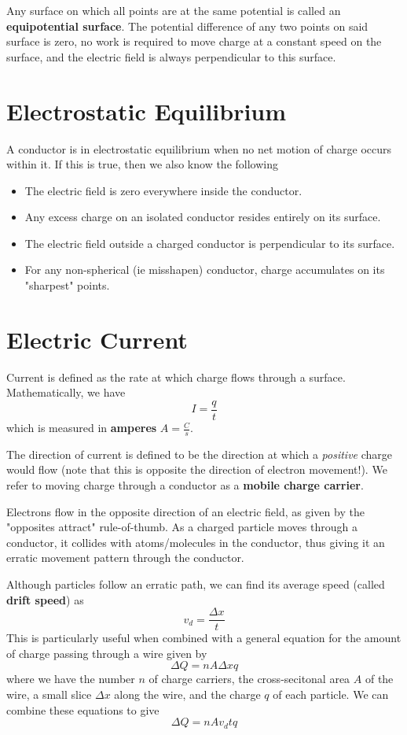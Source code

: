 \documentclass[12pt]{article}
\begin{document}
Any surface on which all points are at the same potential is called an {\bf equipotential surface}. The potential difference of any two points on said surface is zero, no work is required to move charge at a constant speed on the surface, and the electric field is always perpendicular to this surface.

\section*{Electrostatic Equilibrium}
A conductor is in electrostatic equilibrium when no net motion of charge occurs within it. If this is true, then we also know the following
\begin{itemize}
\item The electric field is zero everywhere inside the conductor.
\item Any excess charge on an isolated conductor resides entirely on its surface.
\item The electric field outside a charged conductor is perpendicular to its surface.
\item For any non-spherical (ie misshapen) conductor, charge accumulates on its "sharpest" points.
\end{itemize}

\section*{Electric Current}
Current is defined as the rate at which charge flows through a surface. Mathematically, we have \[ I = \frac{q}{t} \] which is measured in {\bf amperes} $A = \frac{C}{s}$.

The direction of current is defined to be the direction at which a \emph{positive} charge would flow (note that this is opposite the direction of electron movement!). We refer to moving charge through a conductor as a {\bf mobile charge carrier}.

Electrons flow in the opposite direction of an electric field, as given by the "opposites attract" rule-of-thumb. As a charged particle moves through a conductor, it collides with atoms/molecules in the conductor, thus giving it an erratic movement pattern through the conductor.

Although particles follow an erratic path, we can find its average speed (called {\bf drift speed}) as \[ v_d = \frac{\Delta x}{t} \] This is particularly useful when combined with a general equation for the amount of charge passing through a wire given by \[ \Delta Q = n A \Delta x q \] where we have the number $n$ of charge carriers, the cross-secitonal area $A$ of the wire, a small slice $\Delta x$ along the wire, and the charge $q$ of each particle. We can combine these equations to give \[ \Delta Q = n A v_d t q \]
\end{document}
